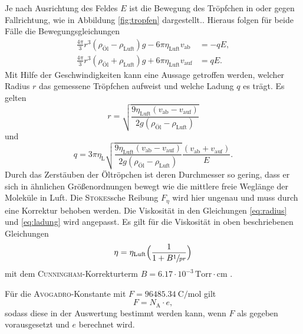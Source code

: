 Je nach Ausrichtung des Feldes $E$ ist die Bewegung des Tröpfchen in oder gegen Fallrichtung, wie in Abbildung \ref{fig:tropfen} dargestellt..
Hieraus folgen für beide Fälle die Bewegungsgleichungen
\begin{align}
	\frac{4\pi}{3}r^3(\rho_\text{Öl}-\rho_\text{Luft})g-6\pi\eta_\text{Luft}v_\text{ab} &= -q E,\\
	\frac{4\pi}{3}r^3(\rho_\text{Öl}+\rho_\text{Luft})g+6\pi\eta_\text{Luft}v_\text{auf}&= q E.
	\label{eq:bewgl_2}
\end{align}
Mit Hilfe der Geschwindigkeiten kann eine Aussage getroffen werden,
welcher Radius $r$ das gemessene Tröpfchen aufweist und welche Ladung $q$ es trägt.
Es gelten
\begin{equation}
	r=\sqrt{\frac{9\eta_\text{Luft}(v_\text{ab}-v_\text{auf})}{2g(\rho_\text{Öl}-\rho_\text{Luft})}}
	\label{eq:radius}
\end{equation}
und
\begin{equation}
	q=3\pi\eta_\text{L}\sqrt{\frac{9\eta_\text{Luft}(v_\text{ab}-v_\text{auf})}{2g(\rho_\text{Öl}-\rho_\text{Luft})}}\frac{(v_\text{ab}+v_\text{auf})}{E}.
	\label{eq:ladung}
\end{equation}
Durch das Zerstäuben der Öltröpchen ist deren Durchmesser so gering, dass er sich in ähnlichen Größenordnungen bewegt wie die mittlere freie Weglänge der Moleküle in Luft. Die \textsc{Stokes}sche Reibung  $F_{\eta}$ wird hier ungenau und muss durch eine Korrektur behoben werden. Die Viskosität in den Gleichungen \eqref{eq:radius} und \eqref{eq:ladung} wird angepasst. 
Es gilt für die Viskosität in oben beschriebenen Gleichungen
\begin{equation}
	\eta= \eta_\text{Luft}\Bigl(\frac{1}{1+B\sfrac{1}{p r}}\Bigr)
	\label{eq:cunningham}
\end{equation}
mit dem \textsc{Cunningham}-Korrekturterm $B=6.17\cdot 10^{-3}\,\text{Torr}\cdot\text{cm}$ \cite{skript}.

Für die \textsc{Avogadro}-Konstante mit $F=\SI{96485.34}{\coulomb\per\mol}$ \cite{texas_instruments2} gilt
\begin{equation}
	F=N_\text{A}\cdot e,
\label{eq:av}
\end{equation}
sodass diese in der Auswertung bestimmt werden kann, wenn $F$ als gegeben vorausgesetzt und $e$ berechnet wird.
